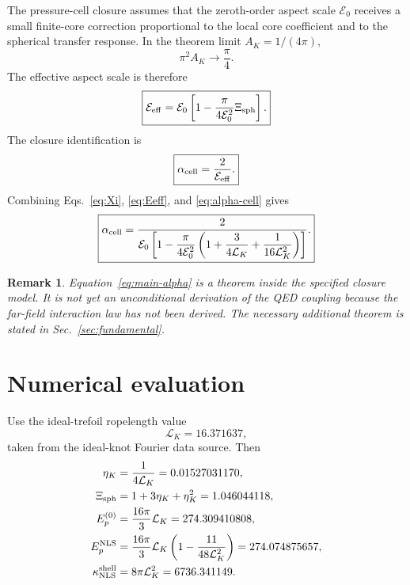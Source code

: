 \documentclass[11pt]{article}
\newcommand{\LK}{\mathcal L_K}
\newcommand{\Ezero}{\mathcal E_0}
\newcommand{\Eeff}{\mathcal E_{\rm eff}}
\newcommand{\Xisph}{\Xi_{\rm sph}}
\newcommand{\alphacell}{\alpha_{\rm cell}}
\newcommand{\EpNLS}{E_p^{\rm NLS}}
\newcommand{\kappaNLS}{\kappa_{\rm NLS}^{\rm shell}}
\newtheorem{remark}{Remark}
\begin{document}
The pressure-cell closure assumes that the zeroth-order aspect scale \(\Ezero\) receives a
small finite-core correction proportional to the local core coefficient and to the spherical
transfer response.  In the theorem limit \(A_K=1/(4\pi)\),
\begin{equation}
  \pi^2 A_K\to\frac{\pi}{4}.
\end{equation}
The effective aspect scale is therefore
\begin{equation}
  \boxed{
  \Eeff
  =
  \Ezero
  \left[
  1-
  \frac{\pi}{4\Ezero^2}\Xisph
  \right].
  }
  \label{eq:Eeff}
\end{equation}
The closure identification is
\begin{equation}
  \boxed{
  \alphacell=\frac{2}{\Eeff}.
  }
  \label{eq:alpha-cell}
\end{equation}
Combining Eqs.~\eqref{eq:Xi}, \eqref{eq:Eeff}, and \eqref{eq:alpha-cell} gives
\begin{equation}
  \boxed{
  \alphacell
  =
  \frac{2}{
  \Ezero
  \left[
  1-\dfrac{\pi}{4\Ezero^2}
  \left(
  1+\dfrac{3}{4\LK}+\dfrac{1}{16\LK^2}
  \right)
  \right]
  }.
  }
  \label{eq:main-alpha}
\end{equation}

\begin{remark}
Equation~\eqref{eq:main-alpha} is a theorem inside the specified closure model.  It is not yet
an unconditional derivation of the QED coupling because the far-field interaction law has not
been derived.  The necessary additional theorem is stated in Sec.~\ref{sec:fundamental}.
\end{remark}

\section{Numerical evaluation}
\label{sec:numerical-evaluation}

Use the ideal-trefoil ropelength value
\begin{equation}
  \mathcal L_K = 16.371637,
\end{equation}
taken from the ideal-knot Fourier data source.  Then
\begin{align}
  \eta_K &= \frac{1}{4\mathcal L_K}=0.01527031170,\\
  \Xi_{\rm sph} &= 1+3\eta_K+\eta_K^2=1.046044118,\\
  E_p^{(0)} &= \frac{16\pi}{3}\mathcal L_K=274.309410808,\\
  \EpNLS
  &=
  \frac{16\pi}{3}\mathcal L_K
  \left(1-\frac{11}{48\mathcal L_K^2}\right)
  =
  274.074875657,\\
  \kappaNLS &= 8\pi\mathcal L_K^2=6736.341149.
\end{align}
\end{document}
